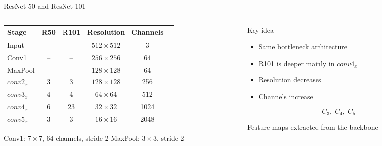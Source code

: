 \documentclass[aspectratio=169,11pt]{beamer}
\begin{document}
\begin{frame}{ResNet-50 and ResNet-101}

\begin{columns}[t]

\begin{column}{0.68\textwidth}

\centering

\begin{tabular}{lccccc}
\toprule
\textbf{Stage} & \textbf{R50} & \textbf{R101} &
\textbf{Resolution} & \textbf{Channels} \\
\midrule
Input       & -- & -- & $512\times512$ & 3 \\
Conv1       & -- & -- & $256\times256$ & 64 \\
MaxPool     & -- & -- & $128\times128$ & 64 \\
$conv2_x$   & 3  & 3  & $128\times128$ & 256 \\
$conv3_x$   & 4  & 4  & $64\times64$   & 512 \\
$conv4_x$   & 6  & 23 & $32\times32$   & 1024 \\
$conv5_x$   & 3  & 3  & $16\times16$   & 2048 \\
\bottomrule
\end{tabular}

\vspace{0.25cm}

{\footnotesize
Conv1: $7\times7$, 64 channels, stride 2
\qquad
MaxPool: $3\times3$, stride 2
}

\end{column}

\begin{column}{0.27\textwidth}

\begin{block}{Key idea}
\footnotesize
\begin{itemize}
    \item Same bottleneck architecture
    \item R101 is deeper mainly in $conv4_x$
    \item Resolution decreases
    \item Channels increase
\end{itemize}
\end{block}

\vspace{0.15cm}

\[
C_3,\;C_4,\;C_5
\]

\footnotesize
Feature maps extracted from the backbone

\end{column}

\end{columns}

\end{frame}
\end{document}

